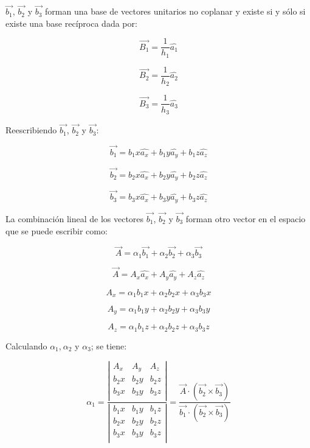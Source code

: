 \documentclass[]{article}
\begin{document}
\(\overrightarrow{b_{1}}\), \(\overrightarrow{b_{2}}\) y
\(\overrightarrow{b_{3}}\) forman una base de vectores unitarios no
coplanar y existe si y sólo si existe una base recíproca dada por:

\[\overrightarrow{B_{1}} = \frac{1}{h_{1}}\widehat{a_{1}}\]

\[\overrightarrow{B_{2}} = \frac{1}{h_{2}}\widehat{a_{2}}\]

\[\overrightarrow{B_{3}} = \frac{1}{h_{3}}\widehat{a_{3}}\]

Reescribiendo \(\overrightarrow{b_{1}}\), \(\overrightarrow{b_{2}}\) y
\(\overrightarrow{b_{3}}\):

\[\overrightarrow{b_{1}} = b_{1}x\widehat{a_{x}} + b_{1}y\widehat{a_{y}} + b_{1}z\widehat{a_{z}}\]

\[\overrightarrow{b_{2}} = b_{2}x\widehat{a_{x}} + b_{2}y\widehat{a_{y}} + b_{2}z\widehat{a_{z}}\]

\[\overrightarrow{b_{3}} = b_{3}x\widehat{a_{x}} + b_{3}y\widehat{a_{y}} + b_{3}z\widehat{a_{z}}\]

La combinación lineal de los vectores \(\overrightarrow{b_{1}}\),
\(\overrightarrow{b_{2}}\) y \(\overrightarrow{b_{3}}\) forman otro
vector en el espacio que se puede escribir como:

\[\overrightarrow{A} = \alpha_{1}\overrightarrow{b_{1}} + \alpha_{2}\overrightarrow{b_{2}} + \alpha_{3}\overrightarrow{b_{3}}\]

\[\overrightarrow{A} = A_{x}\widehat{a_{x}} + A_{y}\widehat{a_{y}} + A_{z}\widehat{a_{z}}\]

\[A_{x} = \alpha_{1}b_{1}x + \alpha_{2}b_{2}x + \alpha_{3}b_{3}x\]

\[A_{y} = \alpha_{1}b_{1}y + \alpha_{2}b_{2}y + \alpha_{3}b_{3}y\]

\[A_{z} = \alpha_{1}b_{1}z + \alpha_{2}b_{2}z + \alpha_{3}b_{3}z\]

Calculando \(\alpha_{1}\),\(\ \alpha_{2}\) y \(\alpha_{3}\); se tiene:

\[\alpha_{1} = \frac{\left| \begin{matrix}
A_{x} & A_{y} & A_{z} \\
b_{2}x & b_{2}y & b_{2}z \\
b_{3}x & b_{3}y & b_{3}z \\
\end{matrix} \right|}{\left| \begin{matrix}
b_{1}x & b_{1}y & b_{1}z \\
b_{2}x & b_{2}y & b_{2}z \\
b_{3}x & b_{3}y & b_{3}z \\
\end{matrix} \right|} = \frac{\overrightarrow{A} \cdot \left( \overrightarrow{b_{2}} \times \overrightarrow{b_{3}} \right)}{\overrightarrow{b_{1}} \cdot \left( \overrightarrow{b_{2}} \times \overrightarrow{b_{3}} \right)}\]
\end{document}
